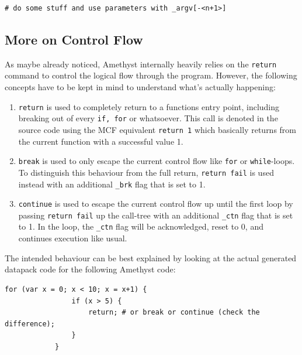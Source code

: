 \documentclass[12pt]{article}
\begin{document}
            \begin{lstlisting}[language=Mcfunction,title=my\_func.mcfunction]
                # do some stuff and use parameters with _argv[-<n+1>]
            \end{lstlisting}
            
    \subsection{More on Control Flow}
        As maybe already noticed, Amethyst internally heavily relies on the \lstinline{return} command to control the logical flow through the program. However, the following concepts have to be kept in mind to understand what's actually happening:
        \begin{enumerate}
            \item \lstinline[language=Amethyst]{return} is used to completely return to a functions entry point, including breaking out of every \lstinline{if, for} or whatsoever. This call is denoted in the source code using the MCF equivalent \lstinline[language=Mcfunction]{return 1} which basically returns from the current function with a successful value 1.
                
            \item \lstinline[language=Amethyst]{break} is used to only escape the current control flow like \lstinline{for} or \lstinline{while}-loops. To distinguish this behaviour from the full return, \lstinline[language=Mcfunction]{return fail} is used instead with an additional \lstinline{_brk} flag that is set to 1.

            \item \lstinline[language=Amethyst]{continue} is used to escape the current control flow up until the first loop by passing \lstinline[language=Mcfunction]{return fail} up the call-tree with an additional \lstinline{_ctn} flag that is set to 1. In the loop, the \lstinline{_ctn} flag will be acknowledged, reset to 0, and continues execution like usual.
        \end{enumerate}
            
        The intended behaviour can be best explained by looking at the actual generated datapack code for the following Amethyst code:
        \begin{lstlisting}[language=Amethyst]
            for (var x = 0; x < 10; x = x+1) {
                if (x > 5) {
                    return; # or break or continue (check the difference);
                }
            }
        \end{lstlisting}
\end{document}
